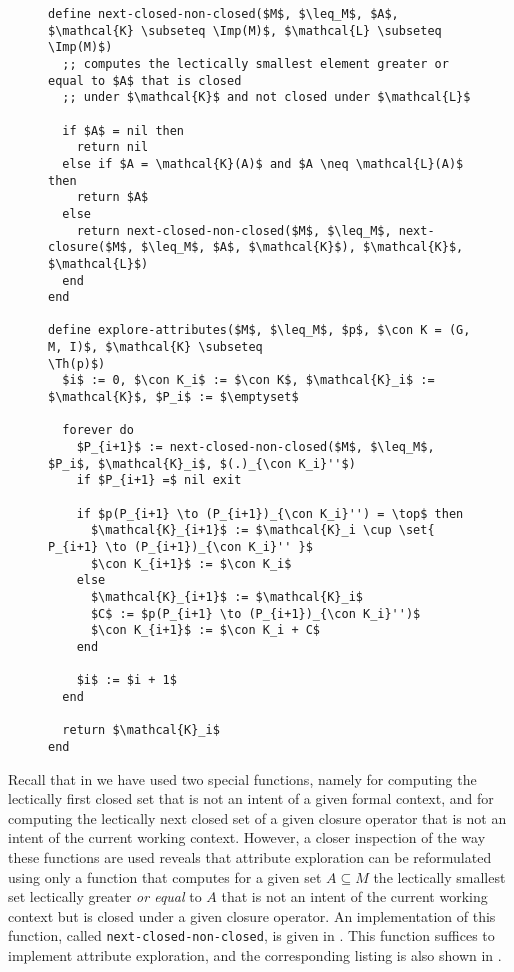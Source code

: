 \begin{figure}[tp]
  \begin{Algorithm}
  \label{alg:explore-attributes-with-next-closed-none-closed}
  \hspace*{0cm}
\begin{lstlisting}
define next-closed-non-closed($M$, $\leq_M$, $A$, $\mathcal{K} \subseteq \Imp(M)$, $\mathcal{L} \subseteq \Imp(M)$)
  ;; computes the lectically smallest element greater or equal to $A$ that is closed
  ;; under $\mathcal{K}$ and not closed under $\mathcal{L}$

  if $A$ = nil then
    return nil
  else if $A = \mathcal{K}(A)$ and $A \neq \mathcal{L}(A)$ then
    return $A$
  else
    return next-closed-non-closed($M$, $\leq_M$, next-closure($M$, $\leq_M$, $A$, $\mathcal{K}$), $\mathcal{K}$, $\mathcal{L}$)
  end
end

define explore-attributes($M$, $\leq_M$, $p$, $\con K = (G, M, I)$, $\mathcal{K} \subseteq
\Th(p)$)
  $i$ := 0, $\con K_i$ := $\con K$, $\mathcal{K}_i$ := $\mathcal{K}$, $P_i$ := $\emptyset$

  forever do
    $P_{i+1}$ := next-closed-non-closed($M$, $\leq_M$, $P_i$, $\mathcal{K}_i$, $(.)_{\con K_i}''$)
    if $P_{i+1} =$ nil exit

    if $p(P_{i+1} \to (P_{i+1})_{\con K_i}'') = \top$ then
      $\mathcal{K}_{i+1}$ := $\mathcal{K}_i \cup \set{ P_{i+1} \to (P_{i+1})_{\con K_i}'' }$
      $\con K_{i+1}$ := $\con K_i$
    else
      $\mathcal{K}_{i+1}$ := $\mathcal{K}_i$
      $C$ := $p(P_{i+1} \to (P_{i+1})_{\con K_i}'')$
      $\con K_{i+1}$ := $\con K_i + C$
    end

    $i$ := $i + 1$
  end

  return $\mathcal{K}_i$  
end
\end{lstlisting}
  \end{Algorithm}
\end{figure}

Recall that in  we have used two special functions, namely
for computing the lectically first closed set that is not an intent of a given formal
context, and for computing the lectically next closed set of a given closure operator that
is not an intent of the current working context.  However, a closer inspection of the way
these functions are used reveals that attribute exploration can be reformulated using only
a function that computes for a given set $A \subseteq M$ the lectically smallest set
lectically greater \emph{or equal} to $A$ that is not an intent of the current working
context but is closed under a given closure operator.  An implementation of this function,
called \lstinline{next-closed-non-closed}, is given in
.  This function suffices to
implement attribute exploration, and the corresponding listing is also shown in
.

